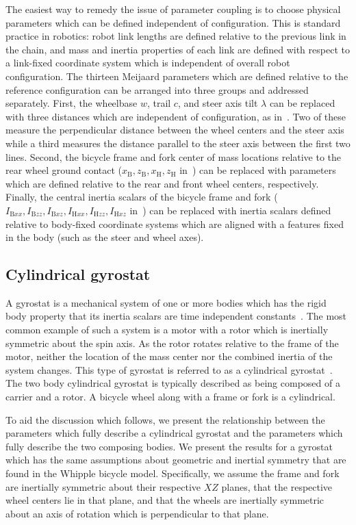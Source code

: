 The easiest way to remedy the issue of parameter coupling is to choose physical
parameters which can be defined independent of configuration. This is standard
practice in robotics: robot link lengths are defined relative to the previous
link in the chain, and mass and inertia properties of each link are defined
with respect to a link-fixed coordinate system which is independent of overall
robot configuration. The thirteen Meijaard parameters which are defined
relative to the reference configuration can be arranged into three groups and
addressed separately. First, the wheelbase $w$, trail $c$, and steer axis tilt
$\lambda$ can be replaced with three distances which are independent of
configuration, as in~\cite{Franke1990}. Two of these measure the perpendicular
distance between the wheel centers and the steer axis while a third measures
the distance parallel to the steer axis between the first two lines. Second,
the bicycle frame and fork center of mass locations relative to the rear wheel
ground contact ($x_\text{B}, z_\text{B}, x_\text{H}, z_\text{H}$
in~\cite{Meijaard2007}) can be replaced with parameters which are defined
relative to the rear and front wheel centers, respectively. Finally, the
central inertia scalars of the bicycle frame and fork ($I_{\text{B}xx},
I_{\text{B}zz}, I_{\text{B}xz}, I_{\text{H}xx}, I_{\text{H}zz}, I_{\text{H}xz}$
in~\cite{Meijaard2007}) can be replaced with inertia scalars defined relative
to body-fixed coordinate systems which are aligned with a features fixed in the
body (such as the steer and wheel axes).

\subsection{Cylindrical gyrostat} \label{model:cylindrical_gyrostat}
A gyrostat is a mechanical system of one or more bodies which has the rigid
body property that its inertia scalars are time independent
constants~\cite{Wittenburg2008}. The most common example of such a system is a
motor with a rotor which is inertially symmetric about the spin axis. As the
rotor rotates relative to the frame of the motor, neither the location of the
mass center nor the combined inertia of the system changes. This type of
gyrostat is referred to as a cylindrical gyrostat~\cite{Mitiguy2001}. The two
body cylindrical gyrostat is typically described as being composed of a carrier
and a rotor. A bicycle wheel along with a frame or fork is a cylindrical.

To aid the discussion which follows, we present the relationship between the
parameters which fully describe a cylindrical gyrostat and the parameters which
fully describe the two composing bodies. We present the results for a gyrostat
which has the same assumptions about geometric and inertial symmetry that are
found in the Whipple bicycle model. Specifically, we assume the frame and fork
are inertially symmetric about their respective $XZ$ planes, that the
respective wheel centers lie in that plane, and that the wheels are inertially
symmetric about an axis of rotation which is perpendicular to that plane.


